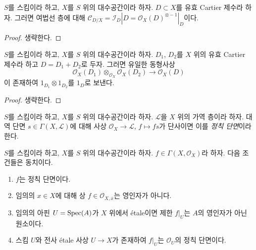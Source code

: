 \begin{lemma}
\label{lemma-conormal-effective-Cartier-divisor}
$S$를 스킴이라 하고, $X$를 $S$ 위의 대수공간이라 하자.
$D \subset X$를 유효 Cartier 제수라 하자. 그러면 여법선 층에 대해
$\mathcal{C}_{D/X} = \mathcal{I}_D|D =
\mathcal{O}_X(D)^{\otimes -1}|_D$이다.
\end{lemma}

\begin{proof}
생략한다.
\end{proof}

\begin{lemma}
\label{lemma-invertible-sheaf-sum-effective-Cartier-divisors}
$S$를 스킴이라 하고, $X$를 $S$ 위의 대수공간이라 하자.
$D_1$, $D_2$를 $X$ 위의 유효 Cartier 제수라 하고
$D = D_1 + D_2$로 두자. 그러면 유일한 동형사상
$$
\mathcal{O}_X(D_1) \otimes_{\mathcal{O}_X} \mathcal{O}_X(D_2)
\longrightarrow
\mathcal{O}_X(D)
$$
이 존재하여 $1_{D_1} \otimes 1_{D_2}$를 $1_D$로 보낸다.
\end{lemma}

\begin{proof}
생략한다.
\end{proof}

\begin{definition}
\label{definition-regular-section}
$S$를 스킴이라 하고, $X$를 $S$ 위의 대수공간이라 하자.
$\mathcal{L}$을 $X$ 위의 가역 층이라 하자. 대역 단면
$s \in \Gamma(X, \mathcal{L})$에 대해 사상
$\mathcal{O}_X \to \mathcal{L}$, $f \mapsto fs$가 단사이면 이를
{\it 정칙 단면}이라 한다.
\end{definition}

\begin{lemma}
\label{lemma-regular-section-structure-sheaf}
$S$를 스킴이라 하고, $X$를 $S$ 위의 대수공간이라 하자.
$f \in \Gamma(X, \mathcal{O}_X)$라 하자. 다음 조건들은 동치이다.
\begin{enumerate}
\item $f$는 정칙 단면이다.
\item 임의의 $x \in X$에 대해 상 $f \in \mathcal{O}_{X, \overline{x}}$는
영인자가 아니다.
\item 임의의 아핀 $U = \mathop{\mathrm{Spec}}(A)$가 $X$ 위에서 \'etale이면 제한
$f|_U$는 $A$의 영인자가 아닌 원소이다.
\item 스킴 $U$와 전사 \'etale 사상 $U \to X$가 존재하여 $f|_U$는
$\mathcal{O}_U$의 정칙 단면이다.
\end{enumerate}
\end{lemma}

